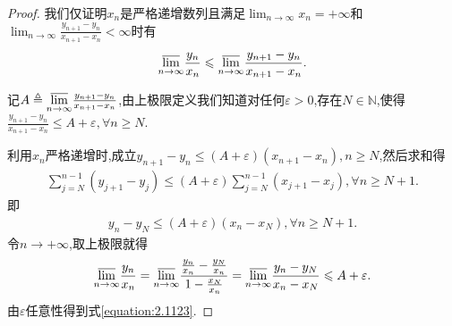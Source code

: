 \documentclass[../../main.tex]{subfiles}
\begin{document}
\begin{proof}
我们仅证明\(x_n\)是严格递增数列且满足\(\lim_{n \to \infty} x_n = +\infty\)和\(\lim_{n \to \infty} \frac{y_{n + 1} - y_n}{x_{n + 1} - x_n} < \infty\)时有
\begin{align}\label{equation:2.1123}
\underset{n\rightarrow \infty}{{\varlimsup }} \frac{y_n}{x_n} \leqslant \underset{n\rightarrow \infty}{{\varlimsup }} \frac{y_{n + 1} - y_n}{x_{n + 1} - x_n}.
\end{align}

记\(A \triangleq \underset{n\rightarrow \infty}{{\varlimsup }} \frac{y_{n + 1} - y_n}{x_{n + 1} - x_n}\),由上极限定义我们知道对任何\(\varepsilon > 0\),存在\(N \in \mathbb{N}\),使得
\(\frac{y_{n + 1} - y_n}{x_{n + 1} - x_n} \leqslant A + \varepsilon, \forall n \geqslant N\).

利用\(x_n\)严格递增时,成立\(y_{n + 1} - y_n \leqslant (A + \varepsilon)(x_{n + 1} - x_n), n \geqslant N\),然后求和得
\begin{align*}
\sum\limits_{j = N}^{n - 1} (y_{j + 1} - y_j) \leqslant (A + \varepsilon) \sum\limits_{j = N}^{n - 1} (x_{j + 1} - x_j), \forall n \geqslant N + 1.
\end{align*}
即
\begin{align*}
y_n - y_N \leqslant (A + \varepsilon)(x_n - x_N), \forall n \geqslant N + 1.
\end{align*}
令$n\to+\infty$,取上极限就得
\begin{align*}
\underset{n\rightarrow \infty}{{\varlimsup }} \frac{y_n}{x_n} = \underset{n\rightarrow \infty}{{\varlimsup }} \frac{\frac{y_n}{x_n} - \frac{y_N}{x_n}}{1 - \frac{x_N}{x_n}} = \underset{n\rightarrow \infty}{{\varlimsup }} \frac{y_n - y_N}{x_n - x_N} \leqslant A + \varepsilon.
\end{align*}
由\(\varepsilon\)任意性得到式\eqref{equation:2.1123}.

\end{proof}
\end{document}
